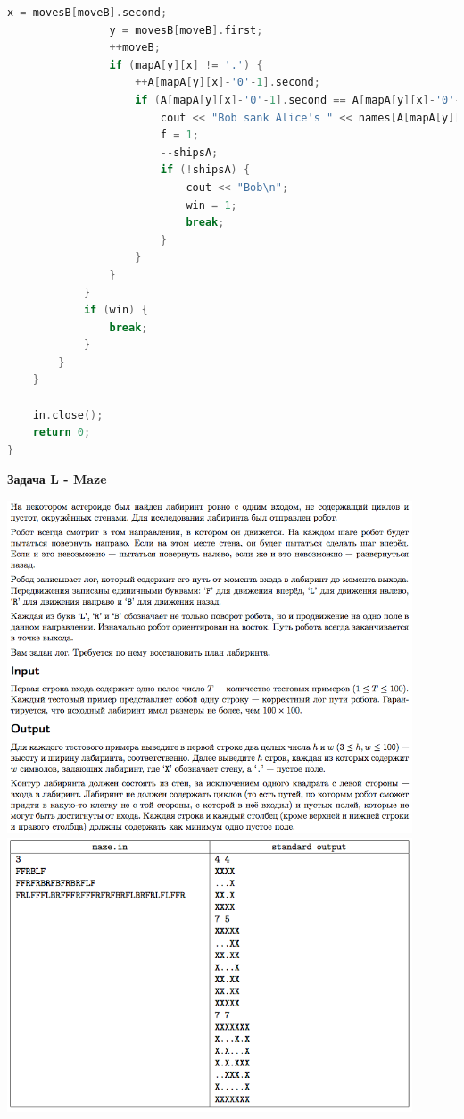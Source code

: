 \documentclass[a4paper,12pt]{article}
\begin{document}
\begin{lstlisting}[language=C++]
                x = movesB[moveB].second;
                y = movesB[moveB].first;
                ++moveB;
                if (mapA[y][x] != '.') {
                    ++A[mapA[y][x]-'0'-1].second;
                    if (A[mapA[y][x]-'0'-1].second == A[mapA[y][x]-'0'-1].first) {
                        cout << "Bob sank Alice's " << names[A[mapA[y][x]-'0'-1].first-1] << '\n';
                        f = 1;
                        --shipsA;
                        if (!shipsA) {
                            cout << "Bob\n";
                            win = 1;
                            break;
                        }
                    }
                }
            }
            if (win) {
                break;
            }
        }
    }

    in.close();
    return 0;
}
\end{lstlisting}

\newpage
\textbf{{\large Задача L - Maze}}

\begin{center}
\includegraphics[width=0.9\textwidth]{OC_Karelia/OC_Karelia_L1.png}\\ [1cm]
\includegraphics[width=0.9\textwidth]{OC_Karelia/OC_Karelia_L2.png}\\ [1cm]
\end{center}
\end{document}
